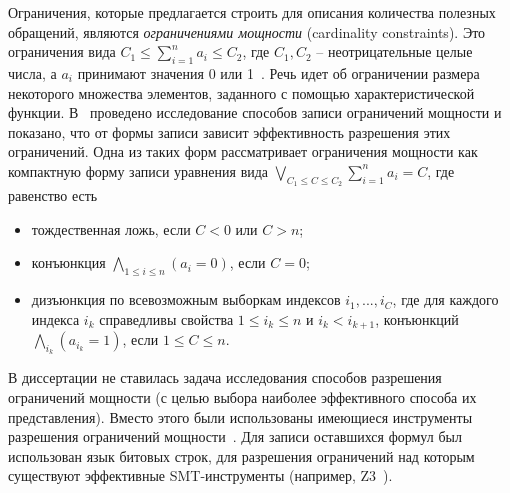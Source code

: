 Ограничения, которые предлагается строить для описания количества полезных обращений, являются \emph{ограничениями мощности} (cardinality constraints). Это
ограничения вида $C_1 \leqslant \sum_{i=1}^n a_i \leqslant C_2$, где $C_1, C_2$
-- неотрицательные целые числа, а $a_i$ принимают значения 0 или
1~\cite{smt_debugging, PiskacK08, KuncakR07,
Revesz05}. Речь идет об ограничении размера некоторого множества
элементов, заданного с помощью характеристической функции.
В~\cite{smt_debugging} проведено исследование способов записи
ограничений мощности и показано, что от формы записи зависит
эффективность разрешения этих ограничений. Одна из таких форм рассматривает ограничения
мощности как компактную форму записи уравнения
вида $\bigvee_{C_1 \leqslant C \leqslant C_2} \sum_{i=1}^n a_i = C$,
где равенство есть
\begin{itemize}
\item тождественная ложь, если $C < 0$ или $C > n$;
\item конъюнкция $\bigwedge_{1\leqslant i\leqslant n} (a_i = 0)$,
если $C = 0$;
\item дизъюнкция по всевозможным выборкам индексов $i_1, ..., i_C$, где
для каждого индекса $i_k$ справедливы свойства $1 \leqslant i_k
\leqslant n$ и $i_k < i_{k+1}$, конъюнкций $\bigwedge_{i_k} (a_{i_k}
= 1)$, если $1 \leqslant C \leqslant n$.
\end{itemize}

В диссертации не ставилась задача исследования способов разрешения ограничений
мощности (с целью выбора наиболее эффективного способа их представления). Вместо
этого были использованы
имеющиеся инструменты разрешения ограничений мощности~\cite{Z3, Yices}. Для
записи оставшихся формул был использован язык битовых строк, для разрешения
ограничений над которым существуют эффективные SMT-инструменты (например,
Z3~\cite{Z3}).

